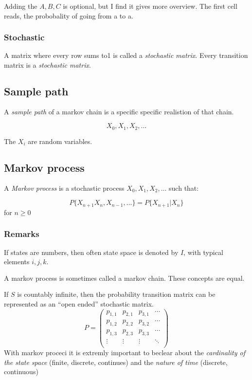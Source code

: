 \documentclass{article}
\begin{document}
Adding the $A,B,C$ is optional, but I find it gives more overview. The first
cell reads, the probobality of going from a to a.

\subsubsection{Stochastic}
A matrix where every row sums to1 is called a \emph{stochastic matrix}. Every
transition matrix is a \emph{stochastic matrix}.

\subsection{Sample path}
A \emph{sample path} of a markov chain is a specific specific realistion of
that chain.

\[ X_0,X_1,X_2,\dots\]

The $X_i$ are random variables.

\subsection{Markov process}
A \emph{Markov process} is a stochastic process $X_0, X_1, X_2, \dots$ such 
that:

\[ P\{ X_{n+1} X_n, X_{n-1}, \dots\}=P\{X_{n+1}|X_n\}\]
for $n \ge 0$

\subsubsection{Remarks}
If states are numbers, then often state space is denoted by $I$, with 
typical elements $i,j,k$.

A markov process is sometimes called a markov chain. These concepts are
equal.

If $S$ is countably infinite, then the probability transition matrix
can be represented as an ``open ended'' stochastic matrix.
\[
	P =
\begin{pmatrix}
	p_{1,1}	& p_{2,1}	& p_{3,1} & \cdots\\
	p_{1,2}	& p_{2,2}	& p_{3,2}	& \cdots\\
	p_{1,3}	& p_{2,3}	& p_{3,3}	& \cdots\\
	\vdots	& \vdots	& \vdots		& \ddots \\
\end{pmatrix}
\]
With markov proceci it is extremly important to beclear about the
\emph{cardinality of the state space} (finite, discrete, continues) and
the \emph{nature of time} (discrete, continuous)
\end{document}
